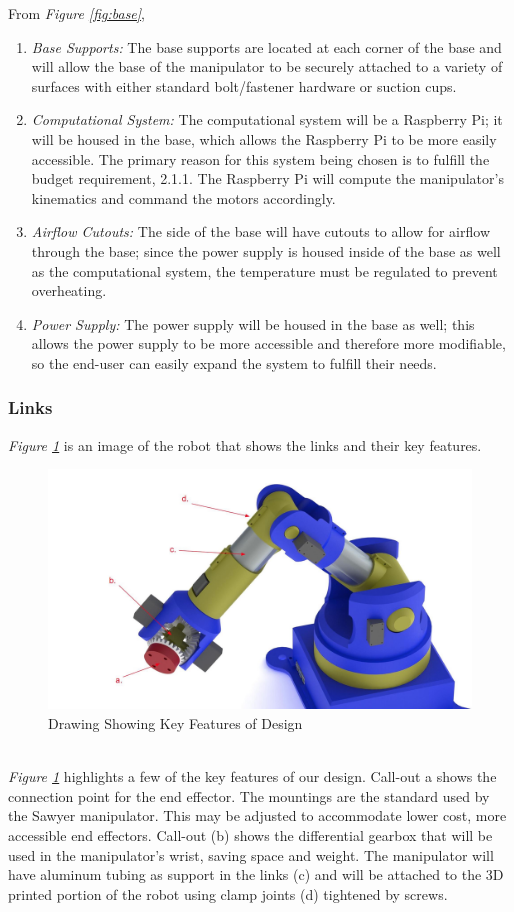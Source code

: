 \documentclass[12pt]{report}
\begin{document}
From \emph{Figure \ref{fig:base}},
\begin{enumerate}[label=\alph*.]
  \item \emph{Base Supports:}
  The base supports are located at each corner of the base and will allow the base of the manipulator to be securely attached to a variety of surfaces with either standard bolt/fastener hardware or suction cups.
  \item \emph{Computational System:}
  The computational system will be a Raspberry Pi; it will be housed in the base, which allows the Raspberry Pi to be more easily accessible. The primary reason for this system being chosen is to fulfill the budget requirement, 2.1.1. The Raspberry Pi will compute the manipulator's kinematics and command the motors accordingly.
  \item \emph{Airflow Cutouts:}
  The side of the base will have cutouts to allow for airflow through the base; since the power supply is housed inside of the base as well as the computational system, the temperature must be regulated to prevent overheating.
  \item \emph{Power Supply:}
  The power supply will be housed in the base as well; this allows the power supply to be more accessible and therefore more modifiable, so the end-user can easily expand the system to fulfill their needs.
\end{enumerate}
\newpage
\subsubsection{Links}
\emph{Figure \ref{fig:link1}} is an image of the robot that shows the links and their key features.\\
\begin{figure}[htp]
  \centering
  \includegraphics[frame,width=.63\textwidth]{link_callouts}
  \caption{Drawing Showing Key Features of Design}
  \label{fig:link1}
\end{figure} \\
\emph{Figure \ref{fig:link1}} highlights a few of the key features of our design. Call-out a shows the connection point for the end effector. The mountings are the standard used by the Sawyer manipulator. This may be adjusted to accommodate lower cost, more accessible end effectors. Call-out (b) shows the differential gearbox that will be used in the manipulator’s wrist, saving space and weight. The manipulator will have aluminum tubing as support in the links (c) and will be attached to the 3D printed portion of the robot using clamp joints (d) tightened by screws.
\end{document}
